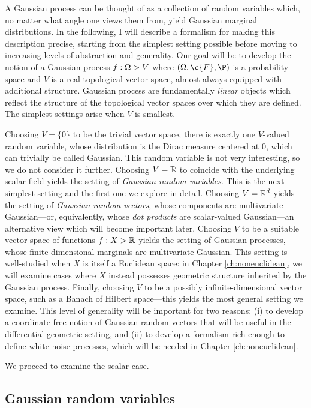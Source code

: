 \documentclass[11pt]{book}
\begin{document}
A Gaussian process can be thought of as a collection of random variables which, no matter what angle one views them from, yield Gaussian marginal distributions.
In the following, I will describe a formalism for making this description precise, starting from the simplest setting possible before moving to increasing levels of abstraction and generality.
Our goal will be to develop the notion of a Gaussian process $f : \Omega \-> V$ where $(\Omega,\c{F},\P)$ is a probability space and $V$ is a real topological vector space, almost always equipped with additional structure.
Gaussian process are fundamentally \emph{linear} objects which reflect the structure of the topological vector spaces over which they are defined.
The simplest settings arise when $V$ is smallest.

\1  Choosing $V = \{0\}$ to be the trivial vector space, there is exactly one $V$-valued random variable, whose distribution is the Dirac measure centered at $0$, which can trivially be called Gaussian.
This random variable is not very interesting, so we do not consider it further.
\2 Choosing $V = \mathbb{R}$ to coincide with the underlying scalar field yields the setting of \emph{Gaussian random variables}.
This is the next-simplest setting and the first one we explore in detail.
\3 Choosing $V = \mathbb{R}^d$ yields the setting of \emph{Gaussian random vectors}, whose components are multivariate Gaussian---or, equivalently, whose \emph{dot products} are scalar-valued Gaussian---an alternative view which will become important later.
\4 Choosing $V$ to be a suitable vector space of functions $f : X \-> \mathbb{R}$ yields the setting of Gaussian processes, whose finite-dimensional marginals are multivariate Gaussian.
This setting is well-studied when $X$ is itself a Euclidean space: in Chapter \ref{ch:noneuclidean}, we will examine cases where $X$ instead possesses geometric structure inherited by the Gaussian process.
\5 Finally, choosing $V$ to be a possibly infinite-dimensional vector space, such as a Banach of Hilbert space---this yields the most general setting we examine.
This level of generality will be important for two reasons: (i) to develop a coordinate-free notion of Gaussian random vectors that will be useful in the differential-geometric setting, and (ii) to develop a formalism rich enough to define white noise processes, which will be needed in Chapter \ref{ch:noneuclidean}.
\0 

We proceed to examine the scalar case.

\subsection{Gaussian random variables}
\end{document}
